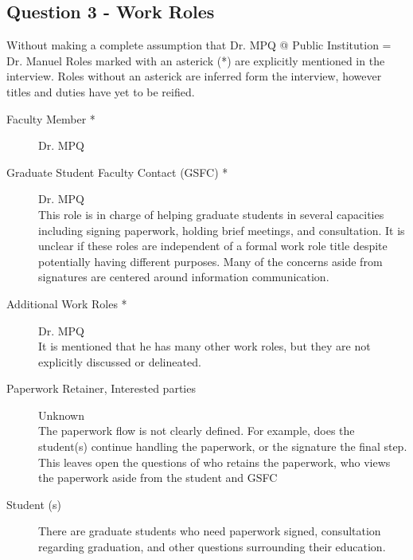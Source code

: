 \documentclass[11pt]{article}
\begin{document}
  
  \subsection{Question 3 - Work Roles}
  Without making a complete assumption that Dr. MPQ @ Public Institution = Dr. Manuel 
  Roles marked with an asterick (\**) are explicitly mentioned in the interview.
  Roles without an asterick are inferred form the interview, however titles and duties have yet to be reified.
  \begin{description} %
  \item[Faculty Member \**]
  Dr. MPQ\\
  \item[Graduate Student Faculty Contact (GSFC) \**]
  Dr. MPQ\\
  This role is in charge of helping graduate students in several capacities including signing paperwork, holding brief meetings, and consultation.
  It is unclear if these roles are independent of a formal work role title despite potentially having different purposes.
  Many of the concerns aside from signatures are centered around information communication.

  \item[Additional Work Roles \**]
  Dr. MPQ\\
  It is mentioned that he has many other work roles, but they are not explicitly discussed or delineated.

  \item[Paperwork Retainer, Interested parties]
  Unknown\\
  The paperwork flow is not clearly defined.
  For example, does the student(s) continue handling the paperwork, or the signature the final step.
  This leaves open the questions of who retains the paperwork, who views the paperwork aside from the student and GSFC

  \item[Student (s)]
  There are graduate students who need paperwork signed, consultation regarding graduation, and other questions surrounding their education.
  
  \end{description}
\end{document}
